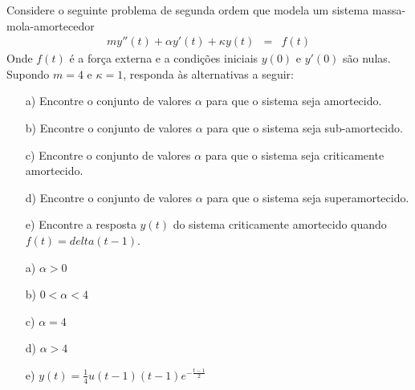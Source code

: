\documentclass[Main.tex]{subfiles}
\begin{document}
\begin{Exercise}
 Considere o seguinte problema de segunda ordem que modela um sistema massa-mola-amortecedor
\begin{eqnarray*}
 m y''(t) +\alpha y'(t) + \kappa y(t) &=& f(t)
 \end{eqnarray*}
Onde $f(t)$ é a força externa e a condições iniciais $y(0)$ e $y'(0)$ são nulas.
 Supondo $m=4$ e $\kappa=1$, responda às alternativas a seguir:
 \begin{itemize}
  \item [a)] Encontre o conjunto de valores $\alpha$ para que o sistema seja amortecido.
  \item [b)] Encontre o conjunto de valores $\alpha$ para que o sistema seja sub-amortecido.
  \item [c)] Encontre o conjunto de valores $\alpha$ para que o sistema seja criticamente amortecido.
  \item [d)] Encontre o conjunto de valores $\alpha$ para que o sistema seja superamortecido. 
  \item [e)] Encontre a resposta $y(t)$ do sistema criticamente amortecido quando $f(t)=delta(t-1)$.
 \end{itemize}

\end{Exercise}
\begin{Answer}
 \begin{itemize}
  \item [a)] $\alpha>0$
  \item [b)] $0<\alpha<4$
  \item [c)] $\alpha=4$
  \item [d)] $\alpha>4$
  \item [e)] $y(t)=\frac{1}{4} u(t-1) (t-1) e^{-\frac{t-1}{2}}$
 \end{itemize}

\end{Answer}
\end{document}
